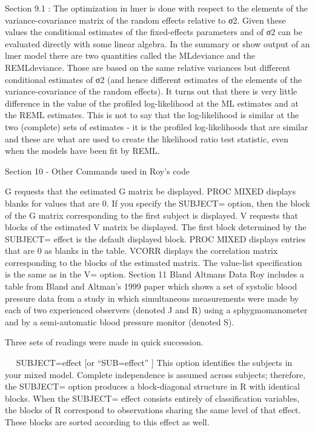 Section 9.1 : The optimization in lmer is done with respect to the elements of the variance-covariance matrix of the random effects relative to σ2. Given these values the conditional estimates of the fixed-effects parameters and of σ2 can be evaluated directly with some linear algebra. In the summary or show output of an lmer model there are two quantities called the MLdeviance and the REMLdeviance. 
Those are based on the same relative variances but different conditional estimates of σ2 (and hence different estimates of the elements of the variance-covariance of the random effects). It turns out that there is very little difference in the value of the profiled log-likelihood at the ML estimates and at the REML estimates. 
This is not to say that the log-likelihood is similar at the two (complete) sets of estimates - it is the profiled log-likelihoods that are similar and these are what are used to create the likelihood ratio test statistic, even when the models have been fit by REML.

Section 10 - Other Commands used in Roy’s code

G requests that the estimated G matrix be displayed. PROC MIXED displays blanks for values that are 0. 
If you specify the SUBJECT= option, then the block of the  G matrix corresponding to the first subject is displayed. 
V requests that blocks of the estimated V matrix be displayed. The first block determined by the SUBJECT= effect is the default displayed block. PROC MIXED displays entries that are 0 as blanks in the table. 
VCORR displays the correlation matrix corresponding to the blocks of the estimated  matrix. 
The value-list specification is the same as in the V= option. 
Section 11 Bland Altmans Data
Roy includes a table from Bland and Altman’s 1999 paper which shows a set of systolic blood pressure data from a study in which simultaneous measurements were made by each of two experienced observers (denoted J and R) using a sphygmomanometer and by a semi-automatic blood pressure monitor (denoted S).

 Three sets of readings were made in quick succession.


 
SUBJECT=effect 	[or “SUB=effect” ]
This option identifies the subjects in your mixed model. 
Complete independence is assumed across subjects; therefore, the SUBJECT= option produces a block-diagonal structure in R with identical blocks. 
When the SUBJECT= effect consists entirely of classification variables, the blocks of  R correspond to observations sharing the same level of that effect. 
These blocks are sorted according to this effect as well. 

